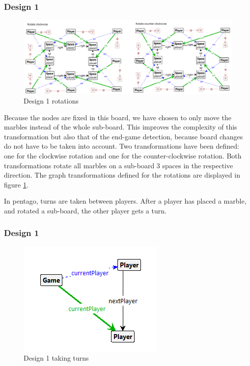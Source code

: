 \subsubsection{Design 1}
\begin{figure}[!h]
    \centering
    \includegraphics[scale=0.5,clip]{Images/rotate1.png}
    \caption{Design 1 rotations}
    \label{fig:rotate1}
\end{figure}

Because the nodes are fixed in this board, we have chosen to only move the marbles instead of the whole sub-board.
This improves the complexity of this transformation but also that of the end-game detection, because board changes do not have to be taken into account.
Two transformations have been defined: one for the clockwise rotation and one for the counter-clockwise rotation.
Both transformations rotate all marbles on a sub-board 3 spaces in the respective direction.
The graph transformations defined for the rotations are displayed in figure \ref{fig:rotate1}.

In pentago, turns are taken between players. 
After a player has placed a marble, and rotated a sub-board, the other player gets a turn.
\subsubsection{Design 1}
\begin{figure}[!h]
    \centering
    \includegraphics[scale=0.5,clip]{Images/turn1.png}
    \caption{Design 1 taking turns}
    \label{fig:turn1}
\end{figure}

